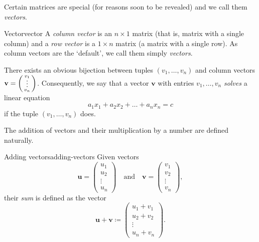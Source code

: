 Certain matrices are special (for reasons soon to be revealed) and we call them
\emph{vectors}.

\begin{definition}{Vector}{vector}
 A \emph{column vector} is an $n \times 1$ matrix (that is, matrix with a single
 column) and a \emph{row vector} is a $1 \times n$ matrix (a matrix with a
 single row). As column vectors are the `default', we call them simply
 \emph{vectors}.
\end{definition}

There exists an obvious bijection between tuples $(v_1,\ldots,v_n)$ and column
vectors $\mathbf{v} = \begin{psmallmatrix} v_1\\[-4pt]\vdots\\v_n
\end{psmallmatrix}$. Consequently, we say that a vector $\mathbf{v}$ with
entries $v_1,\ldots,v_n$ \emph{solves} a linear equation
\[
 a_1x_1 + a_2x_2 + \ldots + a_nx_n = c
\]
if the tuple $(v_1,\ldots,v_n)$ does.

The addition of vectors and their multiplication by a number are defined
naturally.

\begin{definition}{Adding vectors}{adding-vectors}
 Given vectors
 \[
  \mathbf{u} =
  \begin{pmatrix}
   u_1\\
   u_2\\
   \vdots\\
   u_n
  \end{pmatrix}
  \quad \text{and} \quad 
  \mathbf{v} = 
  \begin{pmatrix}
   v_1\\
   v_2\\
   \vdots\\
   v_n
  \end{pmatrix},
 \]
 their \emph{sum} is defined as the vector
 \[
  \mathbf{u} + \mathbf{v} \coloneqq 
  \begin{pmatrix}
   u_1 + v_1\\
   u_2 + v_2\\
   \vdots\\
   u_n + v_n
  \end{pmatrix}.
 \]
\end{definition}

